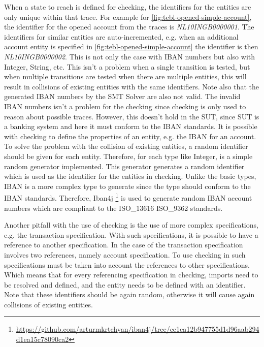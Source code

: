 When a state to reach is defined for checking, the identifiers for the entities
are only unique within that trace. For example for
\autoref{fig:tebl-opened-simple-account}, the identifier for the opened account
from the traces is \textit{NL10INGB0000001}. The identifiers for similar
entities are auto-incremented, e.g. when an additional account entity is
specified in \autoref{fig:tebl-opened-simple-account} the identifier is then
\textit{NL10INGB0000002}. This is not only the case with IBAN numbers but also
with Integer, String, etc. This isn't a problem when a single transition is
tested, but when multiple transitions are tested when there are multiple
entities, this will result in collisions of existing entities with the same
identifiers. Note also that the generated IBAN numbers by the SMT Solver are
also not valid.  The invalid IBAN numbers isn't a problem for the
checking since checking is only used to reason about possible traces. However,
this doesn't hold in the SUT, since SUT is a banking system and here it must
conform to the IBAN standards. It is possible with checking to define the
properties of an entity, e.g. the IBAN for an account. To solve the problem with
the collision of existing entities, a random identifier should be given for each
entity. Therefore, for each type like Integer, is a simple random generator
implemented. This generator generates a random identifier which is used as the
identifier for the entities in checking. Unlike the basic types, IBAN is a more
complex type to generate since the type should conform to the IBAN standards.
Therefore, Iban4j \footnote{\url{https://github.com/arturmkrtchyan/iban4j/tree/ce1ca12b947755d1d96aab294d1ea15c78090ca2}}
is used to generate random IBAN account numbers which are compliant to the
ISO\_13616 ISO\_9362 standards.

Another pitfall with the use of checking is the use of more complex
specifications, e.g. the transaction specification. With such specifications, it
is possible to have a reference to another specification. In the case of the
transaction specification involves two references, namely account specification.
To use checking in such specifications must be taken into account the references
to other specifications. Which means that for every referencing specification in
checking, imports need to be resolved and defined, and the entity needs to be
defined with an identifier. Note that these identifiers should be again random,
otherwise it will cause again collisions of existing entities.

